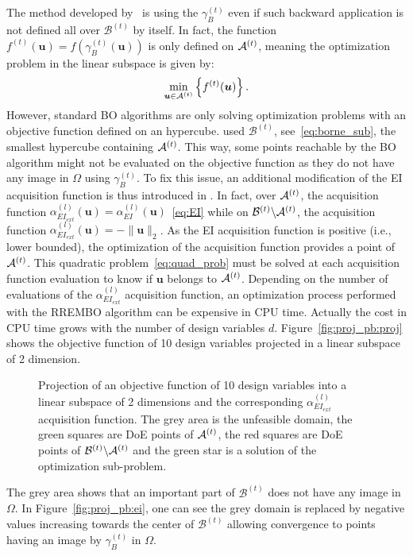 The method developed by~\cite{binoisChoiceLowdimensionalDomain2020} is using the $\gamma_B^{(t)}$ even if such backward application is not defined all over $\mathcal{B}^{(t)}$ by itself.
In fact, the function $f^{(t)}(\bm{u})=f\left(\gamma_B^{(t)}(\bm{u})\right)$ is only defined on ${\mathcal{A}}^{(t)}$, meaning the optimization problem in the linear subspace is given by:
\begin{equation}
    \min_{\bm{u}\in{\mathcal{A}}^{(t)}}\left\{f^{(t)}(\bm{u})\right\}.
    \label{eq:rrembo_pb}
\end{equation}
However, standard BO algorithms are only solving optimization problems with an objective function defined on an hypercube. \citet{binoisChoiceLowdimensionalDomain2020} used  $\mathcal{B}^{(t)}$, see~\eqref{eq:borne_sub}, the smallest hypercube containing ${\mathcal{A}}^{(t)}$.
This way, some points reachable by the BO algorithm might not be evaluated on the objective function as they do not have any image in $\Omega$ using $\gamma_B^{(t)}$.
To fix this issue, an additional modification of the EI acquisition function is thus introduced in \cite{binoisChoiceLowdimensionalDomain2020}. In fact, over ${\mathcal{A}}^{(t)}$, the acquisition function $\alpha^{(l)}_{EI_{ext}}(\bm{u}) = \alpha^{(l)}_{EI}(\bm{u})$~\eqref{eq:EI} while on $\mathcal{B}^{(t)} \backslash {\mathcal{A}}^{(t)}$, the acquisition function $\alpha^{(l)}_{EI_{ext}}(\bm{u}) = -\| \bm{u} \|_2$.
As the EI acquisition function is positive (i.e., lower bounded), the optimization of the acquisition function provides a point of ${\mathcal{A}}^{(t)}$. This quadratic problem~\eqref{eq:quad_prob} must be solved at each acquisition function evaluation to know if $\bm{u}$ belongs to ${\mathcal{A}}^{(t)}$.
Depending on the number of evaluations of the $\alpha^{(l)}_{EI_{ext}}$ acquisition function, an optimization process performed with the RREMBO algorithm can be expensive in CPU time.
Actually the cost in CPU time grows with the number of design variables $d$.
Figure~\ref{fig:proj_pb:proj} shows the objective function of 10 design variables projected in a linear subspace of 2 dimension.
\begin{figure}[!hbt]
    \centering
    \caption{Projection of an objective function of 10 design variables into a linear subspace of 2 dimensions and the corresponding ${\alpha^{(l)}_{EI_{ext}}}$ acquisition function. The grey area is the unfeasible domain, the green squares are DoE points of ${\mathcal{A}}^{(t)}$, the red squares are DoE points of $\mathcal{B}^{(t)} \backslash {\mathcal{A}}^{(t)}$ and the green star is a solution of the optimization sub-problem.}
    \label{fig:proj_pb}
\end{figure}
The grey area shows that an important part of $\mathcal{B}^{(t)}$ does not have any image in $\Omega$. 
In Figure~\ref{fig:proj_pb:ei}, one can see the grey domain is replaced by negative values increasing towards the center of $\mathcal{B}^{(t)}$ allowing convergence to points having an image by $\gamma_B^{(t)}$ in $\Omega$.

